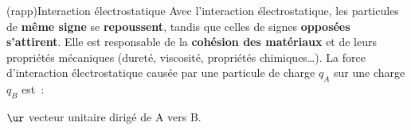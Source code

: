 \documentclass[../../main/main.tex]{subfiles}
\begin{document}
\begin{tcb}(rapp){Interaction électrostatique}
	Avec l'interaction électrostatique, les particules de \textbf{même signe} se
	\textbf{repoussent}, tandis que celles de signes \textbf{opposées s'attirent}.
	Elle est responsable de la \textbf{cohésion des matériaux} et de leurs
	propriétés mécaniques (dureté, viscosité, propriétés chimiques…).
	\smallbreak
	La force d'interaction électrostatique causée par une particule de charge $q_A$
	sur une charge $q_B$ est~:
	\smallbreak
	\begin{isd}
		\psw{%
			\[
				\Ff_{e,\rm A\ra B} = \frac{1}{4\pi\ep_0} \frac{q_Aq_B}{\rm AB^2}\ur
				\qavec
				\ur = \frac{\vvr{AB}}{\rm AB}
			\]
		}%
		$\ur$ vecteur unitaire dirigé de A vers B.
		\tcblower
		\begin{center}
			\vspace{-15pt}
		\end{center}
	\end{isd}
\end{tcb}
\end{document}
